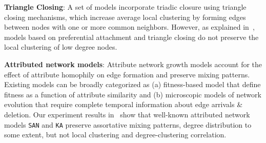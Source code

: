 
\textbf{Triangle Closing}:
A set of models
\cite{holme2002growing,klemm2002highly,leskovec2008microscopic}
incorporate triadic closure using triangle closing mechanisms,
which increase {average} local clustering by forming edges between nodes
with one or more common neighbors. However, as explained in~, models
based on preferential attachment and triangle closing do not preserve the local
clustering of low degree nodes.

\textbf{Attributed network models}:
Attribute network growth models \cite{de2013scale,karimi2017visibility,gong2012evolution,zheleva2009co}
account for the effect of attribute homophily on edge formation and preserve mixing patterns.
Existing models can be broadly categorized as (a) fitness-based model that define fitness as a function of
attribute similarity and (b) microscopic models of network evolution that require
complete temporal information about edge arrivals \& deletion. Our experiment
results in~ show that well-known attributed network models
\texttt{SAN} and \texttt{KA} preserve assortative
mixing patterns, degree distribution to some extent, but not local clustering
and degree-clustering correlation.

